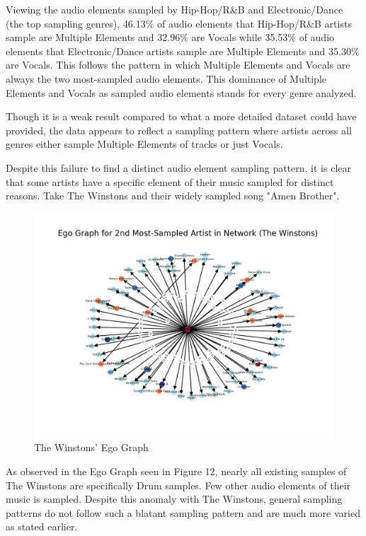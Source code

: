 \documentclass[pageno]{jpaper}
\begin{document}
Viewing the audio elements sampled by Hip-Hop/R\&B and Electronic/Dance (the top sampling genres), 46.13\% of audio elements that Hip-Hop/R\&B artists sample are Multiple Elements and 32.96\% are Vocals while 35.53\% of audio elements that Electronic/Dance artists sample are Multiple Elements and 35.30\% are Vocals. This follows the pattern in which Multiple Elements and Vocals are always the two most-sampled audio elements. This dominance of Multiple Elements and Vocals as sampled audio elements stands for every genre analyzed.

Though it is a weak result compared to what a more detailed dataset could have provided, the data appears to reflect a sampling pattern where artists across all genres either sample Multiple Elements of tracks or just Vocals.

Despite this failure to find a distinct audio element sampling pattern, it is clear that some artists have a specific element of their music sampled for distinct reasons. Take The Winstons and their widely sampled song "Amen Brother".
\begin{figure}[H]
\includegraphics{./EgoGraphs/egoGraphMostSampled2TheWinstons}
\caption{The Winstons' Ego Graph}
\label{fig:fig12}
\centering
\end{figure}
As observed in the Ego Graph seen in Figure 12, nearly all existing samples of The Winstons are specifically Drum samples. Few other audio elements of their music is sampled. Despite this anomaly with The Winstons, general sampling patterns do not follow such a blatant sampling pattern and are much more varied as stated earlier.
\end{document}

